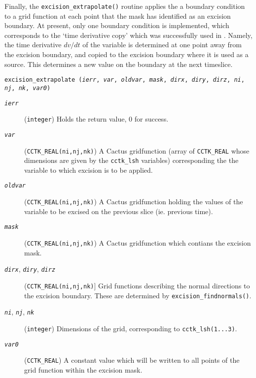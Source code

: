 \documentclass{article}
\begin{document}
Finally, the \texttt{excision\_extrapolate()} routine applies the a
boundary condition to a grid function at each point that the mask has
identified as an excision boundary. At present, only one boundary
condition is implemented, which corresponds to the `time derivative
copy' which was successfully used in
\cite{alcubierre-bruegmann:2001}. Namely, the time derivative $dv/dt$
of the variable is determined at one point away from the excision
boundary, and copied to the excision boundary where it is used as a
source. This determines a new value on the boundary at the next
timeslice.\\\vspace{\baselineskip}

\parbox{.9\linewidth}{
\texttt{excision\_extrapolate (\emph{ierr}, \emph{var}, \emph{oldvar},
  \emph{mask}, \emph{dirx}, \emph{diry}, \emph{dirz}, \emph{ni},
  \emph{nj}, \emph{nk}, \emph{var0})}
\begin{description}
  \item[\texttt{\emph{ierr}}] (\texttt{integer})
    Holds the return value, 0 for success.
  \item[\texttt{\emph{var}}] (\texttt{CCTK\_REAL(ni,nj,nk)})
    A Cactus gridfunction (array of \texttt{CCTK\_REAL} whose
    dimensions are given by the \texttt{cctk\_lsh} variables)
    corresponding the the variable to which excision is to be applied.
  \item[\texttt{\emph{oldvar}}] (\texttt{CCTK\_REAL(ni,nj,nk)})
    A Cactus gridfunction holding the values of the variable
    to be excised on the previous slice (ie. previous time).
  \item[\texttt{\emph{mask}}] (\texttt{CCTK\_REAL(ni,nj,nk)})
    A Cactus gridfunction which contians the excision mask.
  \item[\texttt{\emph{dirx}}, \texttt{\emph{diry}},
    \texttt{\emph{dirz}}] (\texttt{CCTK\_REAL(ni,nj,nk)}]
    Grid functions describing the normal directions to the excision
    boundary. These are determined by \texttt{excision\_findnormals()}.
  \item[\texttt{\emph{ni}}, \texttt{\emph{nj}}, \texttt{\emph{nk}}]
    (\texttt{integer}) Dimensions of the grid, corresponding to
    \texttt{cctk\_lsh(1...3)}.
  \item[\texttt{\emph{var0}}] (\texttt{CCTK\_REAL})
    A constant value which will be written to all points of the grid
    function within the excision mask.
\end{description}
}\\ \vspace{\baselineskip}
\end{document}
